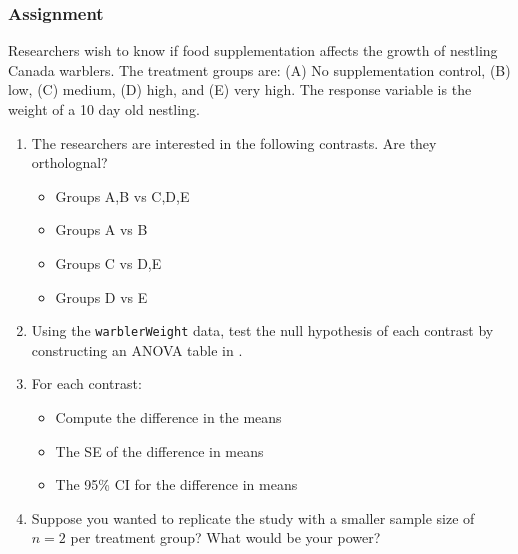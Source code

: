 \documentclass[color=usenames,dvipsnames]{beamer}\usepackage[]{graphicx}\usepackage[]{color}
\begin{document}
\begin{frame}
  \frametitle{Assignment}
  \footnotesize
  Researchers wish to know if food supplementation affects the growth
  of nestling Canada warblers. The treatment groups are: (A) No
  supplementation control, (B) low, (C) medium, (D) high, and (E) very
  high. The response variable is the weight of a 10 day old nestling.
  \begin{enumerate}[\bf (1)]
    \footnotesize
    \item<1-> The researchers are interested in the following
      contrasts. Are they ortholognal?
    \begin{itemize}
    \footnotesize
      \item Groups A,B vs C,D,E
      \item Groups A vs B
      \item Groups C vs D,E
      \item Groups D vs E
    \end{itemize}
    \item<2-> Using the {\tt warblerWeight} data, test the null
      hypothesis of each contrast by constructing an ANOVA table
       in \R.
    \item<3-> For each contrast:
      \begin{itemize}
        \footnotesize
        \item Compute the difference in the means
        \item The SE of the difference in means
        \item The 95\% CI for the difference in means
      \end{itemize}
    \item<5-> Suppose you wanted to replicate the study with a
      smaller sample size of $n=2$ per treatment group? What would be
      your power?
  \end{enumerate}
  \uncover<5->{
  {{\color{red} \bf Due:} Put all of your answers in a
    self-contained \R~script and upload it to ELC before the
    next lab. %
  }}

\end{frame}
\end{document}
